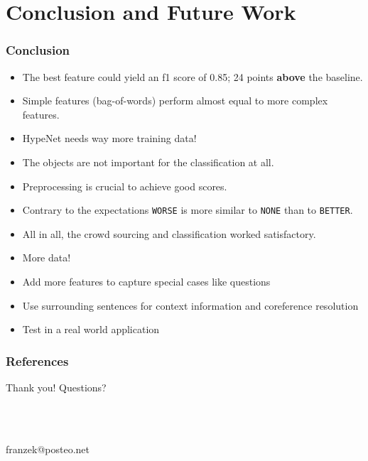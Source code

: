 \documentclass[11pt,aspectratio=169,usenames,dvipsnames]{beamer}
\begin{document}
    \section{Conclusion and Future Work}
    \frame{\sectionpage}
    \begin{frame}[t]
        \frametitle{Conclusion}
        \begin{itemize}
        \item The best feature could yield an f1 score of 0.85; 24 points \textbf{above} the baseline.
        \item Simple features (bag-of-words) perform almost equal to more complex features.
        \item HypeNet needs way more training data!\pause
        \item The objects are not important for the classification at all.
        \item Preprocessing is crucial to achieve good scores.\pause
        \item Contrary to the expectations \texttt{WORSE} is more similar to \texttt{NONE} than to \texttt{BETTER}.
        \item All in all, the crowd sourcing and classification worked satisfactory.
        \end{itemize}
    \end{frame}
    
    \begin{frame}
        \begin{itemize}
        \frametitle{Future work}
    \item More data!
    \item Add more features to capture special cases like questions
    \item Use surrounding sentences for context information and coreference resolution
    \item Test in a real world application
    \end{itemize}
    \end{frame}



    \begin{frame}[allowframebreaks]
        \frametitle{References}
        
        
    \end{frame}
    
    \begin{frame}
    \begin{center}
    \begin{LARGE} Thank you! Questions? \end{LARGE}\\\par
    \hfill \\
    franzek@posteo.net
    \end{center}

    \end{frame}
\end{document}
